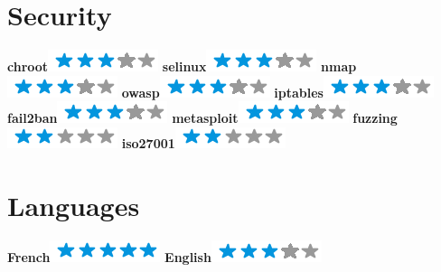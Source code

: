 \documentclass[]{friggeri-cv}
\begin{document}
\begin{aside}
    \section{Security}
        \textbf{chroot}\includegraphics[scale=0.40]{img/3stars.png}
        \textbf{selinux}\includegraphics[scale=0.40]{img/3stars.png}
        \textbf{nmap}\includegraphics[scale=0.40]{img/3stars.png}
        \textbf{owasp}\includegraphics[scale=0.40]{img/3stars.png}
        \textbf{iptables}\includegraphics[scale=0.40]{img/3stars.png}
        \textbf{fail2ban}\includegraphics[scale=0.40]{img/3stars.png}
        \textbf{metasploit}\includegraphics[scale=0.40]{img/3stars.png}
        \textbf{fuzzing}\includegraphics[scale=0.40]{img/2stars.png}
        \textbf{iso27001}\includegraphics[scale=0.40]{img/2stars.png}
        ~
    \section{Languages}
        \textbf{French}\includegraphics[scale=0.40]{img/5stars.png}
        \textbf{English}\includegraphics[scale=0.40]{img/3stars.png}
        ~
\end{aside}
\end{document}
